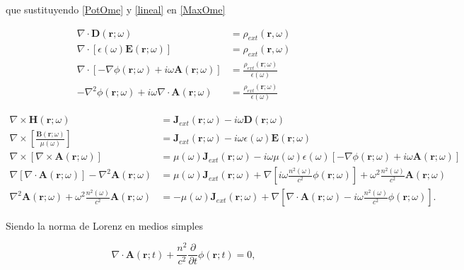 \documentclass[a4paper,10pt]{article}
\begin{document}
que sustituyendo \eqref{PotOme} y \eqref{lineal} en \eqref{MaxOme}

\begin{subequations}
\begin{align}
\nabla\cdot\textbf{D} (\textbf{r};\omega)	&=	\rho_{ext}(\textbf{r},\omega)\\
\nabla\cdot[\epsilon(\omega)\textbf{E}(\textbf{r};\omega)]	&=	\rho_{ext}(\textbf{r},\omega)\\
\nabla\cdot[-\nabla\phi(\textbf{r};\omega)+i\omega\textbf{A}(\textbf{r};\omega)]	&=	\frac{\rho_{ext}(\textbf{r};\omega)}{\epsilon(\omega)}	\\
-\nabla^2\phi(\textbf{r};\omega)+i\omega\nabla\cdot\textbf{A}(\textbf{r};\omega)	&=	\frac{\rho_{ext}(\textbf{r};\omega)}{\epsilon(\omega)}
\end{align}
\label{1max}
\end{subequations}

\begin{subequations}
\begin{align}
\nabla\times\textbf{H}(\textbf{r};\omega)	&=\textbf{J}_{ext}(\textbf{r};\omega)-i\omega\textbf{D}(\textbf{r};\omega) \\
\nabla\times\left[\frac{\textbf{B}(\textbf{r};\omega)}{\mu(\omega)} \right]	&= \textbf{J}_{ext}(\textbf{r};\omega)-i\omega\epsilon(\omega)\textbf{E}(\textbf{r};\omega)	\\
\nabla\times[\nabla\times\textbf{A}(\textbf{r};\omega)]	&= \mu(\omega)\textbf{J}_{ext}(\textbf{r};\omega)-i\omega\mu(\omega)\epsilon(\omega)[-\nabla\phi(\textbf{r};\omega)+i\omega\textbf{A}(\textbf{r};\omega)]	\\
\nabla[\nabla\cdot\textbf{A}(\textbf{r};\omega)]-\nabla^2\textbf{A}(\textbf{r};\omega) &= \mu(\omega)\textbf{J}_{ext}(\textbf{r};\omega)+\nabla[i\omega\frac{n^2(\omega)}{c^2}\phi(\textbf{r};\omega)]+\omega^2\frac{n^2(\omega)}{c^2}\textbf{A}(\textbf{r};\omega)	\\
\nabla^2\textbf{A}(\textbf{r};\omega) +\omega^2\frac{n^2(\omega)}{c^2}\textbf{A}(\textbf{r};\omega)	&=-\mu(\omega)\textbf{J}_{ext}(\textbf{r};\omega)+\nabla[\nabla\cdot\textbf{A}(\textbf{r};\omega)-i\omega\frac{n^2(\omega)}{c^2}\phi(\textbf{r};\omega)].
\end{align}
\label{2max}
\end{subequations}

Siendo la norma de Lorenz en medios simples

\begin{equation}
\nabla\cdot\textbf{A}(\textbf{r};t)+\frac{n^2}{c^2}\frac{\partial}{\partial t}\phi(\textbf{r};t)=0,
\end{equation}
\end{document}
